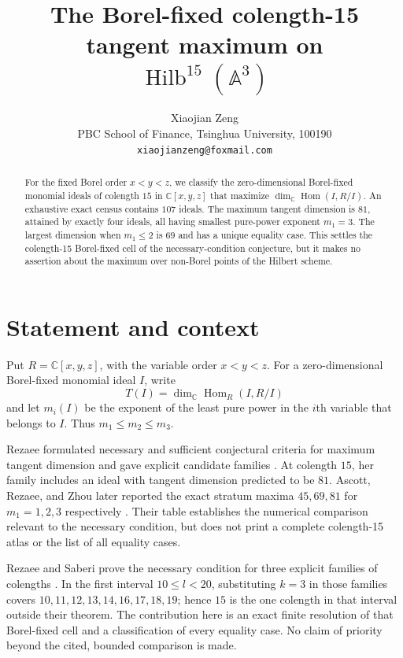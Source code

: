 \documentclass[11pt]{article}
\title{The Borel-fixed colength-15 tangent maximum on \\
  $\operatorname{Hilb}^{15}(\mathbb A^3)$}
\author{Xiaojian Zeng\\
PBC School of Finance, Tsinghua University, 100190\\
\texttt{xiaojianzeng@foxmail.com}}
\date{}
\newcommand{\CC}{\mathbb C}
\begin{document}
\maketitle

\begin{abstract}
For the fixed Borel order $x<y<z$, we classify the zero-dimensional
Borel-fixed monomial ideals of colength $15$ in $\CC[x,y,z]$ that maximize
$\dim_{\CC}\operatorname{Hom}(I,R/I)$.  An exhaustive exact census contains
$107$ ideals.  The maximum tangent dimension is $81$, attained by exactly
four ideals, all having smallest pure-power exponent $m_1=3$.  The largest
dimension when $m_1\leq2$ is $69$ and has a unique equality case.  This
settles the colength-15 Borel-fixed cell of the necessary-condition
conjecture, but it makes no assertion about the maximum over non-Borel
points of the Hilbert scheme.
\end{abstract}

\section{Statement and context}

Put $R=\CC[x,y,z]$, with the variable order $x<y<z$.  For a
zero-dimensional Borel-fixed monomial ideal $I$, write
\[
 T(I)=\dim_{\CC}\operatorname{Hom}_R(I,R/I)
\]
and let $m_i(I)$ be the exponent of the least pure power in the $i$th
variable that belongs to $I$.  Thus $m_1\leq m_2\leq m_3$.

Rezaee formulated necessary and sufficient conjectural criteria for maximum
tangent dimension and gave explicit candidate families
\cite{Rezaee2025}.  At colength $15$, her family includes an ideal with
tangent dimension predicted to be $81$.  Ascott, Rezaee, and Zhou later
reported the exact stratum maxima $45,69,81$ for $m_1=1,2,3$ respectively
\cite{AscottRezaeeZhou2026}.  Their table establishes the numerical
comparison relevant to the necessary condition, but does not print a
complete colength-15 atlas or the list of all equality cases.

Rezaee and Saberi prove the necessary condition for three explicit families
of colengths \cite{RezaeeSaberi2026}.  In the first interval
$10\leq l<20$, substituting $k=3$ in those families covers
$10,11,12,13,14,16,17,18,19$; hence $15$ is the one colength in that
interval outside their theorem.  The contribution here is an exact finite
resolution of that Borel-fixed cell and a classification of every equality
case.  No claim of priority beyond the cited, bounded comparison is made.
\end{document}
